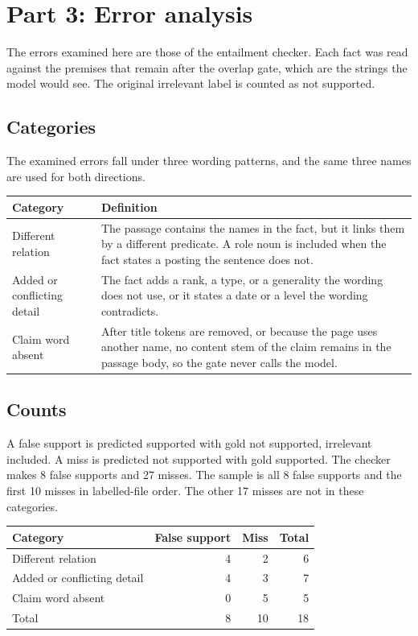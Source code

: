 ﻿\section{Part 3: Error analysis}

The errors examined here are those of the entailment checker. Each fact was read against the premises that remain after the overlap gate, which are the strings the model would see. The original irrelevant label is counted as not supported.

\subsection{Categories}

The examined errors fall under three wording patterns, and the same three names are used for both directions.

\begin{center}
\small
\begin{tabular}{@{}lp{10.6cm}@{}}
\toprule
Category & Definition \\
\midrule
Different relation & The passage contains the names in the fact, but it links them by a different predicate. A role noun is included when the fact states a posting the sentence does not. \\
Added or conflicting detail & The fact adds a rank, a type, or a generality the wording does not use, or it states a date or a level the wording contradicts. \\
Claim word absent & After title tokens are removed, or because the page uses another name, no content stem of the claim remains in the passage body, so the gate never calls the model. \\
\bottomrule
\end{tabular}
\end{center}

\subsection{Counts}

A false support is predicted supported with gold not supported, irrelevant included. A miss is predicted not supported with gold supported. The checker makes 8 false supports and 27 misses. The sample is all 8 false supports and the first 10 misses in labelled-file order. The other 17 misses are not in these categories.

\begin{center}
\small
\begin{tabular}{@{}lrrr@{}}
\toprule
Category & False support & Miss & Total \\
\midrule
Different relation & 4 & 2 & 6 \\
Added or conflicting detail & 4 & 3 & 7 \\
Claim word absent & 0 & 5 & 5 \\
\midrule
Total & 8 & 10 & 18 \\
\bottomrule
\end{tabular}
\end{center}

